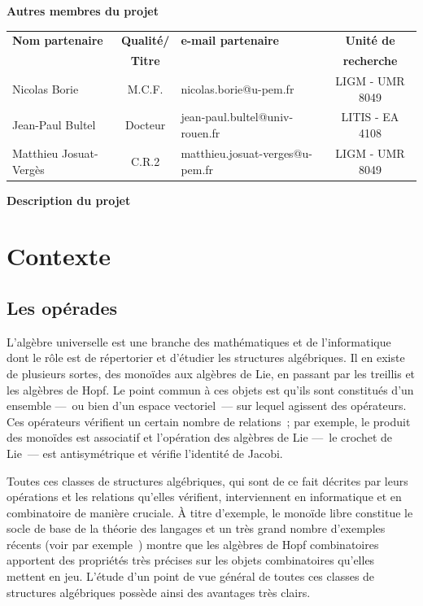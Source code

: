 \documentclass[10pt,reqno]{amsart}
\numberwithin{equation}{subsection}
\begin{document}
\Large{\bf{Autres membres du projet}}

\begin{tabular}{|l|c|l|c|} \hline
    \bf{Nom partenaire} & \bf{Qualité/} & \bf{e-mail partenaire}
        & \bf{Unité de} \\
    & \bf{Titre} &  & \bf{recherche} \\ \hline
    Nicolas Borie & M.C.F. & nicolas.borie@u-pem.fr
        & LIGM - UMR 8049 \\ \hline
    Jean-Paul Bultel & Docteur & jean-paul.bultel@univ-rouen.fr
        & LITIS - EA 4108 \\ \hline
  Matthieu Josuat-Vergès \qquad & C.R.2 & matthieu.josuat-verges@u-pem.fr \qquad
    & LIGM - UMR 8049 \qquad \\ \hline
\end{tabular}
\bigskip

\Large{\bf{Description du projet}}
\bigskip

\section{Contexte}

\subsection{Les opérades}
L'algèbre universelle est une branche des mathématiques et de
l'informatique dont le rôle est de répertorier et d'étudier les
structures algébriques. Il en existe de plusieurs sortes, des monoïdes
aux algèbres de Lie, en passant par les treillis et les algèbres de Hopf.
Le point commun à ces objets est qu'ils sont constitués d'un ensemble
---~ou bien d'un espace vectoriel~--- sur lequel agissent des opérateurs.
Ces opérateurs vérifient un certain nombre de relations~; par exemple,
le produit des monoïdes est associatif et l'opération des algèbres de
Lie ---~le crochet de Lie~--- est antisymétrique et vérifie l'identité
de Jacobi.

Toutes ces classes de structures algébriques, qui sont de ce fait
décrites par leurs opérations et les relations qu'elles vérifient,
interviennent en informatique et en combinatoire de manière cruciale. À
titre d'exemple, le monoïde libre constitue le socle de base de la
théorie des langages et un très grand nombre d'exemples récents (voir
par exemple~\cite{HNT05,Gir12}) montre que les algèbres de Hopf
combinatoires apportent des propriétés très précises sur les objets
combinatoires qu'elles mettent en jeu. L'étude d'un point de vue général
de toutes ces classes de structures algébriques possède ainsi des
avantages très clairs.
\end{document}
